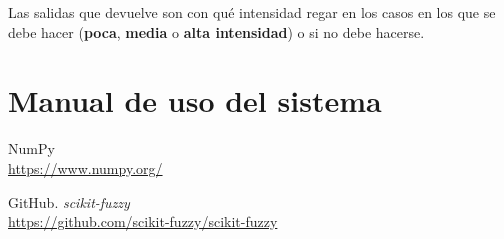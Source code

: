 \documentclass[11pt,a4paper]{article}
\begin{document}
Las salidas que devuelve son con qué intensidad regar en los casos en los que se debe hacer (\textbf{poca}, \textbf{media} o
\textbf{alta intensidad}) o si no debe hacerse.

\newpage

\section{Manual de uso del sistema}

\newpage

\begin{thebibliography}{5}

NumPy
\\\url{https://www.numpy.org/}

GitHub. \textit{scikit-fuzzy}
\\\url{https://github.com/scikit-fuzzy/scikit-fuzzy}



\end{thebibliography}
\end{document}
